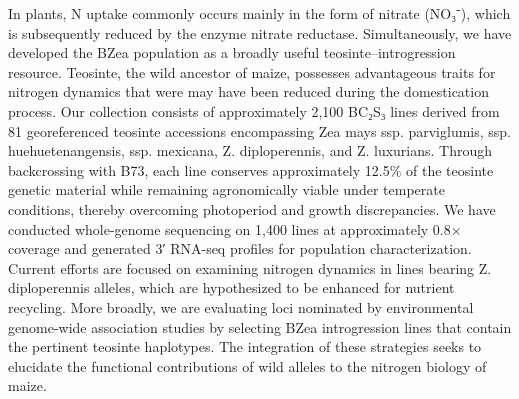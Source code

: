 \documentclass[10pt,letterpaper]{article}
\begin{document}
In plants, N uptake commonly occurs mainly in the form of nitrate (NO₃⁻), which is subsequently reduced by the enzyme nitrate reductase.
Simultaneously, we have developed the BZea population as a broadly useful teosinte–introgression resource. Teosinte, the wild ancestor of maize, possesses advantageous traits for nitrogen dynamics that were may have been reduced during the domestication process. Our collection consists of approximately 2,100 BC₂S₃ lines derived from 81 georeferenced teosinte accessions encompassing Zea mays ssp. parviglumis, ssp. huehuetenangensis, ssp. mexicana, Z. diploperennis, and Z. luxurians. Through backcrossing with B73, each line conserves approximately 12.5\% of the teosinte genetic material while remaining agronomically viable under temperate conditions, thereby overcoming photoperiod and growth discrepancies. We have conducted whole-genome sequencing on 1,400 lines at approximately 0.8× coverage and generated 3′ RNA-seq profiles for population characterization. Current efforts are focused on examining nitrogen dynamics in lines bearing Z. diploperennis alleles, which are hypothesized to be enhanced for nutrient recycling. More broadly, we are evaluating loci nominated by environmental genome-wide association studies by selecting BZea introgression lines that contain the pertinent teosinte haplotypes. The integration of these strategies seeks to elucidate the functional contributions of wild alleles to the nitrogen biology of maize.
\end{document}
